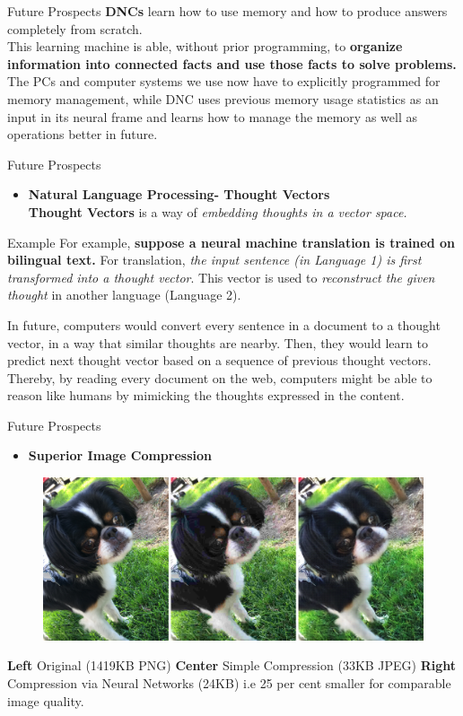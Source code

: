 \documentclass[10pt]{beamer}
\begin{document}
	\begin{frame}[c]{Future Prospects}
	\large{\textbf{DNCs} learn how to use memory and how to produce answers completely from scratch.
	\\
	This learning machine is able, without prior programming, to \textbf{organize information into connected facts and use those facts to solve problems.}
	\\
	\bigskip
 	The PCs and computer systems we use now have to explicitly programmed for memory management, while DNC uses previous memory usage statistics as an input in its neural frame and learns how to manage the memory as well as operations better in future.
 	}
	\end{frame}
	\begin{frame}[c]{Future Prospects}
		\begin{itemize}
			\item \large{\textbf{Natural Language Processing- Thought Vectors}}
			\\
			\bigskip
			\textbf{Thought Vectors} is a way of \textit{\alert{embedding thoughts in a vector space.}}
		\end{itemize}
		\begin{block}{Example}
			For example, \textbf{suppose a neural machine translation is trained on bilingual text.} For translation, \textit{\alert{the input sentence (in Language 1) is first transformed into a thought vector}}. This vector is used to \textit{\alert{reconstruct the given thought}} in another language (Language 2).
		\end{block}
				In future, computers would convert every sentence in a document to a thought vector, in a way that similar thoughts are nearby. Then, they would learn to predict next thought vector based on a sequence of previous thought vectors. Thereby, by reading every document on the web, computers might be able to reason like humans by mimicking the thoughts expressed in the content.
	\end{frame}
	\begin{frame}[c]{Future Prospects}
		\begin{itemize}
		\item \large{\textbf{Superior Image Compression}}
		\end{itemize}
		\begin{figure}
			\includegraphics[width=\linewidth]{images/img_comp}
		\end{figure}
		\textbf{Left} Original (1419KB PNG) \textbf{Center} Simple Compression (33KB JPEG) \textbf{Right} Compression via Neural Networks (24KB)
		\alert{i.e 25 per cent smaller} for comparable image quality.
	\end{frame}
\end{document}
